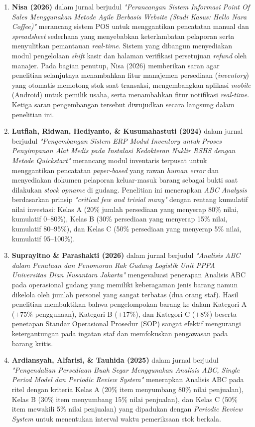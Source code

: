 \documentclass[11pt, a4paper]{article}
\begin{document}
\begin{enumerate}[label=\arabic*.]
    \item \textbf{Nisa (2026)} dalam jurnal berjudul \textit{"Perancangan Sistem Informasi Point Of Sales Menggunakan Metode Agile Berbasis Website (Studi Kasus: Hello Nara Coffee)"} merancang sistem POS untuk menggantikan pencatatan manual dan \textit{spreadsheet} sederhana yang menyebabkan keterlambatan pelaporan serta menyulitkan pemantauan \textit{real-time}. Sistem yang dibangun menyediakan modul pengelolaan \textit{shift} kasir dan halaman verifikasi persetujuan \textit{refund} oleh manajer. Pada bagian penutup, Nisa (2026) memberikan saran agar penelitian selanjutnya menambahkan fitur manajemen persediaan (\textit{inventory}) yang otomatis memotong stok saat transaksi, mengembangkan aplikasi \textit{mobile} (Android) untuk pemilik usaha, serta menambahkan fitur notifikasi \textit{real-time}. Ketiga saran pengembangan tersebut diwujudkan secara langsung dalam penelitian ini.
    \item \textbf{Lutfiah, Ridwan, Hediyanto, \& Kusumahastuti (2024)} dalam jurnal berjudul \textit{"Pengembangan Sistem ERP Modul Inventory untuk Proses Penyimpanan Alat Medis pada Instalasi Kedokteran Nuklir RSHS dengan Metode Quickstart"} merancang modul inventaris terpusat untuk menggantikan pencatatan \textit{paper-based} yang rawan \textit{human error} dan menyediakan dokumen pelaporan keluar-masuk barang sebagai bukti saat dilakukan \textit{stock opname} di gudang. Penelitian ini menerapkan \textit{ABC Analysis} berdasarkan prinsip \textit{"critical few and trivial many"} dengan rentang kumulatif nilai investasi: Kelas A (20\% jumlah persediaan yang menyerap 80\% nilai, kumulatif 0--80\%), Kelas B (30\% persediaan yang menyerap 15\% nilai, kumulatif 80--95\%), dan Kelas C (50\% persediaan yang menyerap 5\% nilai, kumulatif 95--100\%).
    \item \textbf{Suprayitno \& Parashakti (2026)} dalam jurnal berjudul \textit{"Analisis ABC dalam Penataan dan Penomoran Rak Gudang Logistik Unit PPPA Universitas Dian Nusantara Jakarta"} mengevaluasi penerapan Analisis ABC pada operasional gudang yang memiliki keberagaman jenis barang namun dikelola oleh jumlah personel yang sangat terbatas (dua orang staf). Hasil penelitian membuktikan bahwa pengelompokan barang ke dalam Kategori A ($\pm 75\%$ penggunaan), Kategori B ($\pm 17\%$), dan Kategori C ($\pm 8\%$) beserta penetapan Standar Operasional Prosedur (SOP) sangat efektif mengurangi ketergantungan pada ingatan staf dan memfokuskan pengawasan pada barang kritis.
    \item \textbf{Ardiansyah, Alfarisi, \& Tauhida (2025)} dalam jurnal berjudul \textit{"Pengendalian Persediaan Buah Segar Menggunakan Analisis ABC, Single Period Model dan Periodic Review System"} menerapkan Analisis ABC pada ritel dengan kriteria Kelas A (20\% item menyumbang 80\% nilai penjualan), Kelas B (30\% item menyumbang 15\% nilai penjualan), dan Kelas C (50\% item mewakili 5\% nilai penjualan) yang dipadukan dengan \textit{Periodic Review System} untuk menentukan interval waktu pemeriksaan stok berkala.

\end{enumerate}
\end{document}

